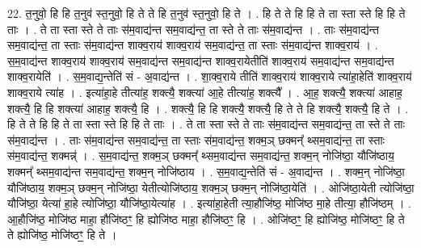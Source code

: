 \documentclass[17pt]{extarticle}
\begin{document}
22. त॒नुवो॒ हि हि त॒नुव॑ स्त॒नुवो॒ हि ते ते हि त॒नुव॑ स्त॒नुवो॒ हि ते । . हि ते ते हि हि ते ता स्ता स्ते हि हि ते ताः । . ते ता स्ता स्ते ते ताः स॑म॒वाद्य॑न्त सम॒वाद्य॑न्त॒ ता स्ते ते ताः स॑म॒वाद्य॑न्त । . ताः स॑म॒वाद्य॑न्त सम॒वाद्य॑न्त॒ ता स्ताः स॑म॒वाद्य॑न्त शाक्व॒राय॑ शाक्व॒राय॑ सम॒वाद्य॑न्त॒ ता स्ताः स॑म॒वाद्य॑न्त शाक्व॒राय॑ । . स॒म॒वाद्य॑न्त शाक्व॒राय॑ शाक्व॒राय॑ सम॒वाद्य॑न्त सम॒वाद्य॑न्त शाक्व॒रायेतीति॑ शाक्व॒राय॑ सम॒वाद्य॑न्त सम॒वाद्य॑न्त शाक्व॒रायेति॑ । . स॒म॒वाद्य॒न्तेति॑ सं - अ॒वाद्य॑न्त । . शा॒क्व॒राये तीति॑ शाक्व॒राय॑ शाक्व॒राये त्या॑हा॒हेति॑ शाक्व॒राय॑ शाक्व॒राये त्या॑ह । . इत्या॑हा॒हे तीत्या॑ह॒ शक्त्यै॒ शक्त्या॑ आ॒हे तीत्या॑ह॒ शक्त्यै᳚ । . आ॒ह॒ शक्त्यै॒ शक्त्या॑ आहाह॒ शक्त्यै॒ हि हि शक्त्या॑ आहाह॒ शक्त्यै॒ हि । . शक्त्यै॒ हि हि शक्त्यै॒ शक्त्यै॒ हि ते ते हि शक्त्यै॒ शक्त्यै॒ हि ते । . हि ते ते हि हि ते ता स्ता स्ते हि हि ते ताः । . ते ता स्ता स्ते ते ताः स॑म॒वाद्य॑न्त सम॒वाद्य॑न्त॒ ता स्ते ते ताः स॑म॒वाद्य॑न्त । . ताः स॑म॒वाद्य॑न्त सम॒वाद्य॑न्त॒ ता स्ताः स॑म॒वाद्य॑न्त॒ शक्म॒ञ् छक्मन्᳚ थ्सम॒वाद्य॑न्त॒ ता स्ताः स॑म॒वाद्य॑न्त॒ शक्मन्न्॑ । . स॒म॒वाद्य॑न्त॒ शक्म॒ञ् छक्मन्᳚ थ्सम॒वाद्य॑न्त सम॒वाद्य॑न्त॒ शक्म॒न् नोजि॑ष्ठा॒ यौजि॑ष्ठाय॒ शक्मन्᳚ थ्सम॒वाद्य॑न्त सम॒वाद्य॑न्त॒ शक्म॒न् नोजि॑ष्ठाय । . स॒म॒वाद्य॒न्तेति॑ सं - अ॒वाद्य॑न्त । . शक्म॒न् नोजि॑ष्ठा॒ यौजि॑ष्ठाय॒ शक्म॒ञ् छक्म॒न् नोजि॑ष्ठा॒ येतीत्योजि॑ष्ठाय॒ शक्म॒ञ् छक्म॒न् नोजि॑ष्ठा॒येति॑ । . ओजि॑ष्ठा॒येती त्योजि॑ष्ठा॒ यौजि॑ष्ठा॒ येत्या॑ हा॒हे त्योजि॑ष्ठा॒ यौजि॑ष्ठा॒येत्या॑ह । . इत्या॑हा॒हेती त्या॒हौजि॑ष्ठ॒ मोजि॑ष्ठ मा॒हे तीत्या॒ हौजि॑ष्ठम् । . आ॒हौजि॑ष्ठ॒ मोजि॑ष्ठ माहा॒ हौजि॑ष्ठꣳ॒॒ हि ह्योजि॑ष्ठ माहा॒ हौजि॑ष्ठꣳ॒॒ हि । . ओजि॑ष्ठꣳ॒॒ हि ह्योजि॑ष्ठ॒ मोजि॑ष्ठꣳ॒॒ हि ते ते ह्योजि॑ष्ठ॒ मोजि॑ष्ठꣳ॒॒ हि ते । \newline
\end{document}

